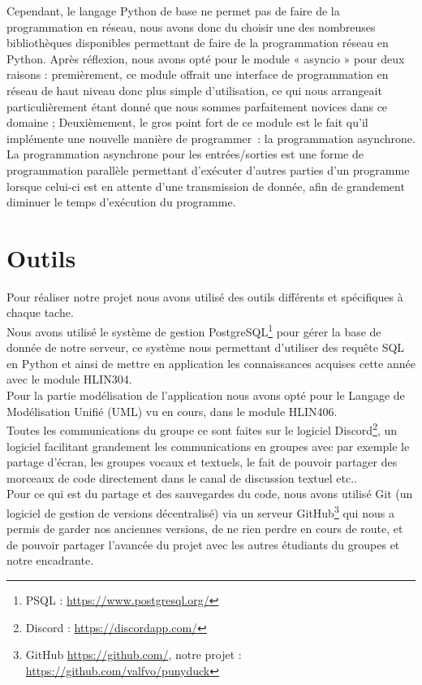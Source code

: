 \documentclass{report}
\begin{document}
Cependant, le langage Python de base ne permet pas de faire de la programmation en réseau, nous avons donc du choisir une des nombreuses bibliothèques disponibles permettant de faire de la programmation réseau en Python. Après réflexion, nous avons opté pour le module « asyncio » pour deux raisons : premièrement, ce module offrait une interface de programmation en réseau de haut niveau donc plus simple d'utilisation, ce qui nous arrangeait particulièrement étant donné que nous sommes parfaitement novices dans ce domaine ; Deuxièmement, le gros point fort de ce module est le fait qu'il implémente une nouvelle manière de programmer~: la programmation asynchrone. La programmation asynchrone pour les entrées/sorties est une forme de programmation parallèle permettant d'exécuter d'autres parties d'un programme lorsque celui-ci est en attente d'une transmission de donnée, afin de grandement diminuer le temps d'exécution du programme. \\

\section{Outils} %
Pour réaliser notre projet nous avons utilisé des outils différents et spécifiques à chaque tache. \\

Nous avons utilisé le système de gestion PostgreSQL\footnote{PSQL : \url{https://www.postgresql.org/}} pour gérer la base de donnée de notre serveur, ce système nous permettant d'utiliser des requête SQL en Python et ainsi de mettre en application les connaissances acquises cette année avec le module HLIN304. \\

Pour la partie modélisation de l'application nous avons opté pour le Langage de Modélisation Unifié (UML) vu en cours, dans le module HLIN406. \\

Toutes les communications du groupe ce sont faites sur le logiciel Discord\footnote{Discord : \url{https://discordapp.com/}}, un logiciel facilitant grandement les communications en groupes avec par exemple le partage d'écran, les groupes vocaux et textuels, le fait de pouvoir partager des morceaux de code directement dans le canal de discussion textuel etc.. \\

Pour ce qui est du partage et des sauvegardes du code, nous avons utilisé Git (un logiciel de gestion de versions décentralisé) via un serveur GitHub\footnote{GitHub \url{https://github.com/}, notre projet : \url{https://github.com/valfvo/punyduck}} qui nous a permis de garder nos anciennes versions, de ne rien perdre en cours de route, et de pouvoir partager l'avancée du projet avec les autres étudiants du groupes et notre encadrante. \\
\end{document}
